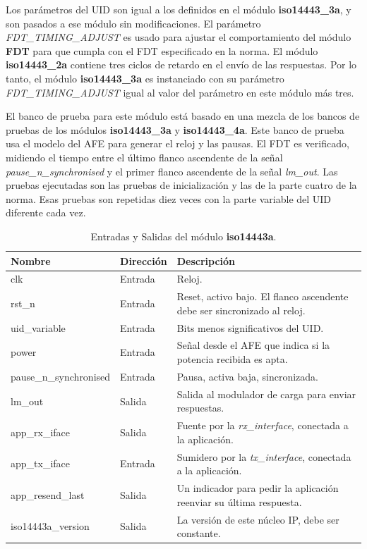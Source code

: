 \documentclass[a4paper, twoside, 11pt]{report}
\begin{document}
Los parámetros del UID son igual a los definidos en el módulo \textbf{iso14443\_3a}, y son pasados a ese módulo sin modificaciones. El parámetro \textit{FDT\_TIMING\_ADJUST} es usado para ajustar el comportamiento del módulo \textbf{FDT} para que cumpla con el FDT especificado en la norma. El módulo \textbf{iso14443\_2a} contiene tres ciclos de retardo en el envío de las respuestas. Por lo tanto, el módulo \textbf{iso14443\_3a} es instanciado con su parámetro \textit{FDT\_TIMING\_ADJUST} igual al valor del parámetro en este módulo más tres.

El banco de prueba para este módulo está basado en una mezcla de los bancos de pruebas de los módulos \textbf{iso14443\_3a} y \textbf{iso14443\_4a}. Este banco de prueba usa el modelo del AFE para generar el reloj y las pausas. El FDT es verificado, midiendo el tiempo entre el último flanco ascendente de la señal \textit{pause\_n\_synchronised} y el primer flanco ascendente de la señal \textit{lm\_out}. Las pruebas ejecutadas son las pruebas de inicialización y las de la parte cuatro de la norma. Esas pruebas son repetidas diez veces con la parte variable del UID diferente cada vez.

\begin{table}[htb]
  \centering
  \tablezebra
  \begin{tabulary}{\linewidth}{l|l|L}
    \textbf{Nombre}&\textbf{Dirección}&\textbf{Descripción} \\
    \hline
    clk&Entrada&Reloj. \\
    rst\_n&Entrada&Reset, activo bajo. El flanco ascendente debe ser sincronizado al reloj. \\
    uid\_variable&Entrada&Bits menos significativos del UID. \\
    power&Entrada&Señal desde el AFE que indica si la potencia recibida es apta. \\
    pause\_n\_synchronised&Entrada&Pausa, activa baja, sincronizada. \\
    lm\_out&Salida&Salida al modulador de carga para enviar respuestas. \\
    app\_rx\_iface&Salida&Fuente por la \textit{rx\_interface}, conectada a la aplicación. \\
    app\_tx\_iface&Entrada&Sumidero por la \textit{tx\_interface}, conectada a la aplicación. \\
    app\_resend\_last&Salida&Un indicador para pedir la aplicación reenviar su última respuesta. \\
    iso14443a\_version&Salida&La versión de este núcleo IP, debe ser constante. \\
  \end{tabulary}
  \caption{Entradas y Salidas del módulo \textbf{iso14443a}.}
  \label{tab:ports_iso14443a}
\end{table}
\end{document}
